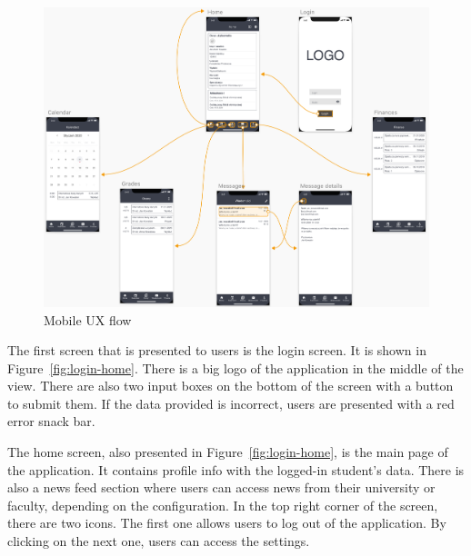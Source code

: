 \begin{figure}[htb]
    \centering
    \includegraphics[width=\textwidth]{fig04/mobile_ux_flow.png}
    \caption{Mobile UX flow}
    \label{fig:ux-flow}
\end{figure}

The first screen that is presented to users is the login screen. It is shown in Figure~\ref{fig:login-home}. There is a big logo of the application in the middle of the view. There are also two input boxes on the bottom of the screen with a button to submit them. If the data provided is incorrect, users are presented with a red error snack bar.

The home screen, also presented in Figure~\ref{fig:login-home}, is the main page of the application. It contains profile info with the logged-in student's data. There is also a news feed section where users can access news from their university or faculty, depending on the configuration. In the top right corner of the screen, there are two icons. The first one allows users to log out of the application. By clicking on the next one, users can access the settings.

